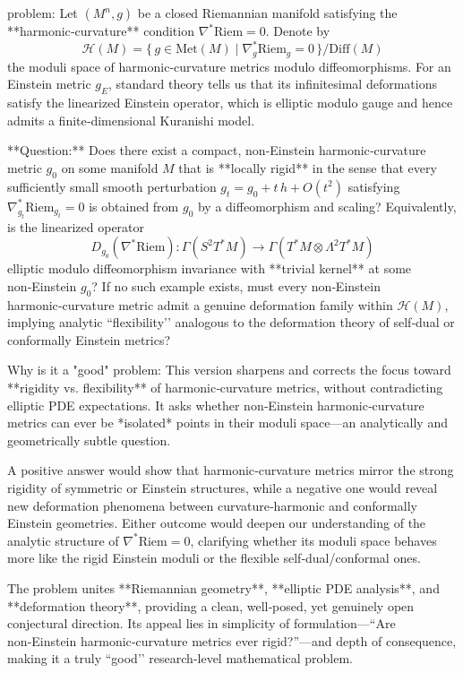 problem:  
Let $(M^n,g)$ be a closed Riemannian manifold satisfying the **harmonic‑curvature** condition $\nabla^*\mathrm{Riem}=0$.  Denote by  
\[
\mathcal{H}(M)=\{\,g\in\mathrm{Met}(M)\mid\nabla^*_g\mathrm{Riem}_g=0\,\}/\mathrm{Diff}(M)
\]
the moduli space of harmonic‑curvature metrics modulo diffeomorphisms.  For an Einstein metric $g_E$, standard theory tells us that its infinitesimal deformations satisfy the linearized Einstein operator, which is elliptic modulo gauge and hence admits a finite‑dimensional Kuranishi model.

**Question:**  
Does there exist a compact, non‑Einstein harmonic‑curvature metric $g_0$ on some manifold $M$ that is **locally rigid** in the sense that every sufficiently small smooth perturbation $g_t=g_0+t\,h+O(t^2)$ satisfying $\nabla^*_{g_t}\mathrm{Riem}_{g_t}=0$ is obtained from $g_0$ by a diffeomorphism and scaling?  
Equivalently, is the linearized operator
\[
D_{g_0}(\nabla^*\mathrm{Riem}) : \Gamma(S^2T^*M)\to \Gamma(T^*M\otimes\Lambda^2T^*M)
\]
elliptic modulo diffeomorphism invariance with **trivial kernel** at some non‑Einstein $g_0$?  
If no such example exists, must every non‑Einstein harmonic‑curvature metric admit a genuine deformation family within $\mathcal{H}(M)$, implying analytic “flexibility’’ analogous to the deformation theory of self‑dual or conformally Einstein metrics?

Why is it a "good" problem:  
This version sharpens and corrects the focus toward **rigidity vs. flexibility** of harmonic‑curvature metrics, without contradicting elliptic PDE expectations.  It asks whether non‑Einstein harmonic‑curvature metrics can ever be *isolated* points in their moduli space—an analytically and geometrically subtle question.  

A positive answer would show that harmonic‑curvature metrics mirror the strong rigidity of symmetric or Einstein structures, while a negative one would reveal new deformation phenomena between curvature‑harmonic and conformally Einstein geometries.  Either outcome would deepen our understanding of the analytic structure of $\nabla^*\mathrm{Riem}=0$, clarifying whether its moduli space behaves more like the rigid Einstein moduli or the flexible self‑dual/conformal ones.  

The problem unites **Riemannian geometry**, **elliptic PDE analysis**, and **deformation theory**, providing a clean, well‑posed, yet genuinely open conjectural direction.  Its appeal lies in simplicity of formulation—“Are non‑Einstein harmonic‑curvature metrics ever rigid?”—and depth of consequence, making it a truly “good’’ research‑level mathematical problem.